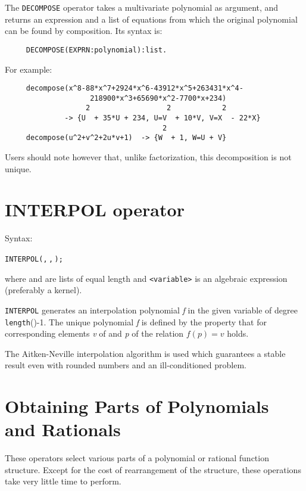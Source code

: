 The \texttt{DECOMPOSE} operator takes a multivariate polynomial as argument,
and returns an expression and a list of equations from which the
original polynomial can be found by composition.  Its syntax is:
\begin{verbatim}
     DECOMPOSE(EXPRN:polynomial):list.
\end{verbatim}
For example:
\begin{verbatim}
     decompose(x^8-88*x^7+2924*x^6-43912*x^5+263431*x^4-
                    218900*x^3+65690*x^2-7700*x+234)
                   2                  2            2
              -> {U  + 35*U + 234, U=V  + 10*V, V=X  - 22*X}
                                     2
     decompose(u^2+v^2+2u*v+1)  -> {W  + 1, W=U + V}
\end{verbatim}
Users should note however that, unlike factorization, this decomposition
is not unique.

\section{INTERPOL operator}
\hypertarget{operator:INTERPOL}{}

Syntax:
\begin{syntax}
  \texttt{INTERPOL(}\texttt{,}\,\texttt{,}\,\texttt{);}
\end{syntax}

where  and  are lists of equal length and
\texttt{<variable>} is an algebraic expression (preferably a kernel).

\texttt{INTERPOL} generates an interpolation polynomial \emph{f} in the given
variable of degree \texttt{length}()-1.  The unique polynomial 
\emph{f}
is defined by the property that for corresponding elements \emph{v} of
 and \emph{p} of  the relation $f(p)=v$ holds.

The Aitken-Neville interpolation algorithm is used which guarantees a
stable result even with rounded numbers and an ill-conditioned problem.

\section{Obtaining Parts of Polynomials and Rationals}

These operators select various parts of a polynomial or rational function
structure. Except for the cost of rearrangement of the structure, these
operations take very little time to perform.

